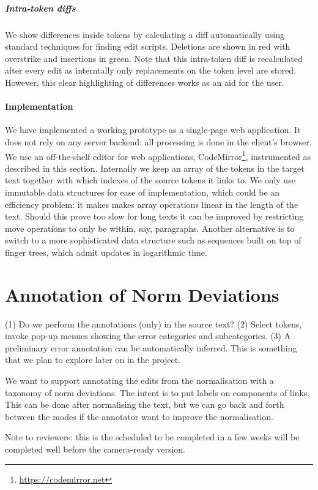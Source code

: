 \documentclass[10pt, a4paper]{article}
\begin{document}
\subparagraph{Intra-token diffs} We show differences inside tokens by
calculating a diff automatically using standard techniques for finding
edit scripts.  Deletions are shown in red with overstrike and insertions
in green.  Note that this intra-token diff is recalculated after every edit
as interntally only replacements on the token level are stored.  However,
this clear highlighting of differences works as an aid for the user.

\paragraph{Implementation}
We have implemented a working prototype as a single-page web application.
It does not rely on any server backend: all processing is done in the
client's browser. We use an off-the-shelf editor for web applications,
CodeMirror\footnote{\url{https://codemirror.net}},
instrumented as described in this section.
Internally we keep an array of the tokens in the target text together with
which indexes of the source tokens it links to.  We only use immutable data
structures for ease of implementation,  which could be an efficiency problem:
it makes makes array operations linear in the length of the text. Should
this prove too slow for long texts it can be improved by restricting move
operations to only be within, say, paragraphs. Another alternative is to
switch to a more sophisticated data structure such as sequences built on
top of finger trees, which admit updates in logarithmic time.

\section{Annotation of Norm Deviations}
\label{sec:ann_tool}

(1) Do we perform the annotations (only) in the source text? (2) Select tokens, invoke pop-up menues showing the error categories and subcategories. (3) A preliminary error annotation can be automatically inferred. This is something that we plan to explore later on in the project.

We want to support annotating the edits from the normalisation with a taxonomy
of norm deviations.  The intent is to put labels on components of links.
This can be done after normalising the text, but we can go back and forth
between the modes if the annotator want to improve the normalisation.

Note to reviewers: this is the scheduled to be completed in a few weeks
will be completed well before the camera-ready version.
%
\end{document}
